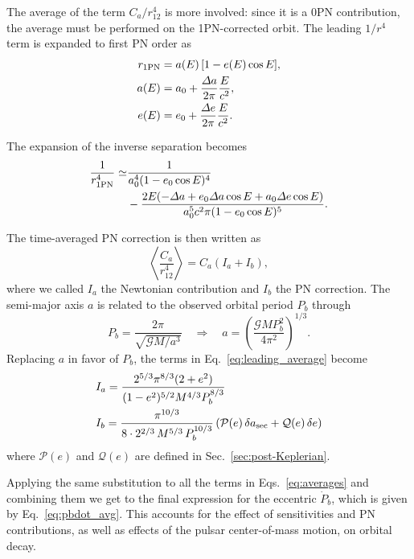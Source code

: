 \documentclass[
    floats,
    floatfix,
    amssymb,
    prd,
    twocolumn,
    superscriptaddress,
    nofootinbib,
    unicode,
    colorlinks=true,
    linktocpage=true
]{revtex4-2}
\begin{document}
The average of the term $C_a/r_{12}^4$ is more involved: since it is a 0PN contribution, the average must be performed on the 1PN-corrected orbit. The leading $1/r^4$ term is expanded to first
PN order as
%
\begin{align}
r_{\rm 1PN}
&= a(E)\,[1 - e(E)\cos E], \\
%
a(E)
&= a_0 +
\frac{\Delta a}{2\pi}
\frac{E}{c^2}, \\
%
e(E)
&= e_0 +
\frac{\Delta e}{2\pi}
\frac{E}{c^2}.
\end{align}

The expansion of the inverse separation becomes
%
\begin{align}
\frac{1}{r_{\rm 1PN}^4}
\simeq
&\frac{1}
 {a_0^4(1-e_0\cos E)^4}
\nonumber \\
&-
\frac{2E(-\Delta a + e_0\Delta a\cos E
+ a_0\Delta e\cos E)}
     {a_0^5 c^2 \pi (1-e_0\cos E)^5}.
\end{align}

The time-averaged PN correction is then written as
%
\begin{equation}
\left\langle\frac{C_a}{r_{12}^4}\right\rangle
=
C_a (I_a + I_b),
\label{eq:leading_average}
\end{equation}
where we called $I_a$ the Newtonian contribution and
$I_b$ the PN correction. The semi-major axis $a$ is related to the observed
orbital period $P_b$ through
%
\begin{equation}
P_b =
\frac{2\pi}{\sqrt{\mathcal{G}M/a^3}}
\quad \Rightarrow \quad
a =
\left(
\frac{\mathcal{G}M P_b^2}{4\pi^2}
\right)^{1/3}.
\end{equation}
%
Replacing $a$ in favor of $P_b$, the terms in Eq.~\eqref{eq:leading_average} become
\begin{align}
&I_a=\frac{2^{5/3}\pi^{8/3}(2+e^2)}
 {(1-e^2)^{5/2}M^{4/3}P_b^{8/3}}
\nonumber\\
&I_b= \frac{\pi^{10/3}}{8\cdot 2^{2/3}\,M^{5/3}\,P_b^{10/3}}
\left(\mathcal{P}(e)\,\delta a_{\rm sec} + \mathcal{Q}(e)\,\delta e\right)
\label{eq:averages}
\end{align}
where $\mathcal{P}(e)$ and $\mathcal{Q}(e)$ are defined in Sec.~\ref{sec:post-Keplerian}.

Applying the same substitution to all the terms in Eqs.~\eqref{eq:averages} and combining them we get to the final expression for the eccentric $\dot{P}_b$, which is given by Eq.~\eqref{eq:pbdot_avg}. This accounts for the effect of sensitivities and PN contributions, as well as
effects of the pulsar center-of-mass motion, on orbital decay.
\end{document}
